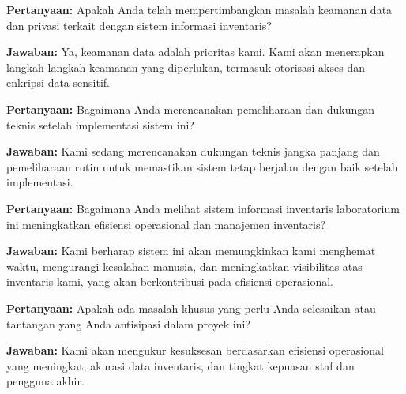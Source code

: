 \begin{flushleft}
  \textbf{Pertanyaan:} Apakah Anda telah mempertimbangkan masalah keamanan data dan privasi terkait dengan sistem informasi inventaris?

  \textbf{Jawaban:} Ya, keamanan data adalah prioritas kami. Kami akan menerapkan langkah-langkah keamanan yang diperlukan, termasuk otorisasi akses dan enkripsi data sensitif.

  \textbf{Pertanyaan:} Bagaimana Anda merencanakan pemeliharaan dan dukungan teknis setelah implementasi sistem ini?

  \textbf{Jawaban:} Kami sedang merencanakan dukungan teknis jangka panjang dan pemeliharaan rutin untuk memastikan sistem tetap berjalan dengan baik setelah implementasi.

  \textbf{Pertanyaan:} Bagaimana Anda melihat sistem informasi inventaris laboratorium ini meningkatkan efisiensi operasional dan manajemen inventaris?

  \textbf{Jawaban:} Kami berharap sistem ini akan memungkinkan kami menghemat waktu, mengurangi kesalahan manusia, dan meningkatkan visibilitas atas inventaris kami, yang akan berkontribusi pada efisiensi operasional.

  \textbf{Pertanyaan:} Apakah ada masalah khusus yang perlu Anda selesaikan atau tantangan yang Anda antisipasi dalam proyek ini?

  \textbf{Jawaban:} Kami akan mengukur kesuksesan berdasarkan efisiensi operasional yang meningkat, akurasi data inventaris, dan tingkat kepuasan staf dan pengguna akhir.

\end{flushleft}
